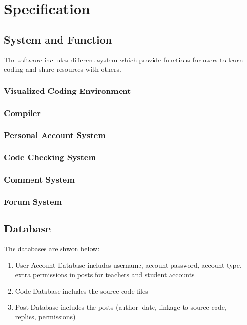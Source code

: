 \chapter{Specification}
\section{System and Function}
The software includes different system which provide functions for users to learn coding and share resources with others.
\subsection{Visualized Coding Environment}
	
\subsection{Compiler}
\subsection{Personal Account System}
	
\subsection{Code Checking System}
	
\subsection{Comment System}
	
\subsection{Forum System}
	
\section{Database}
The databases are shwon below:\par
\begin{enumerate}
	\item User Account Database includes username, account password, account type, extra permissions in posts for teachers and student accounts
	\item Code Database includes the source code files
	\item Post Database includes the posts (author, date, linkage to source code, replies, permissions)
\end{enumerate}
